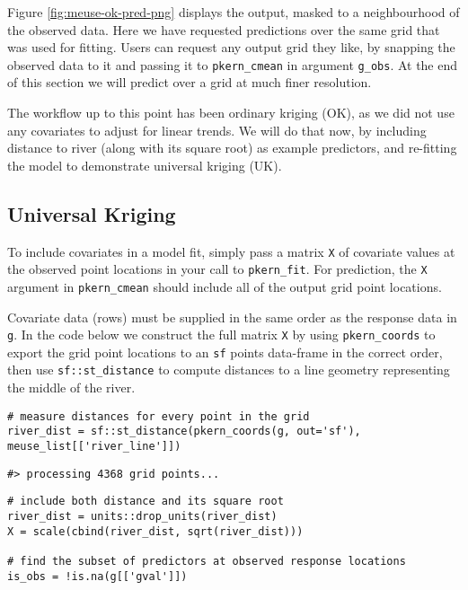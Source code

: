 Figure \ref{fig:meuse-ok-pred-png} displays the output, masked to a neighbourhood of the observed data. Here we have requested predictions over the same grid that was used for fitting. Users can request any output grid they like, by snapping the observed data to it and passing it to \texttt{pkern\_cmean} in argument \texttt{g\_obs}. At the end of this section we will predict over a grid at much finer resolution.

The workflow up to this point has been ordinary kriging (OK), as we did not use any covariates to adjust for linear trends. We will do that now, by including distance to river (along with its square root) as example predictors, and re-fitting the model to demonstrate universal kriging (UK).

\hypertarget{universal-kriging}{%
\subsection{Universal Kriging}\label{universal-kriging}}

To include covariates in a model fit, simply pass a matrix \texttt{X} of covariate values at the observed point locations in your call to \texttt{pkern\_fit}. For prediction, the \texttt{X} argument in \texttt{pkern\_cmean} should include all of the output grid point locations.

Covariate data (rows) must be supplied in the same order as the response data in \texttt{g}. In the code below we construct the full matrix \texttt{X} by using \texttt{pkern\_coords} to export the grid point locations to an \texttt{sf} points data-frame in the correct order, then use \texttt{sf::st\_distance} to compute distances to a line geometry representing the middle of the river.

\begin{verbatim}
# measure distances for every point in the grid
river_dist = sf::st_distance(pkern_coords(g, out='sf'), meuse_list[['river_line']])
\end{verbatim}

\begin{verbatim}
#> processing 4368 grid points...
\end{verbatim}

\begin{verbatim}
# include both distance and its square root
river_dist = units::drop_units(river_dist)
X = scale(cbind(river_dist, sqrt(river_dist)))

# find the subset of predictors at observed response locations
is_obs = !is.na(g[['gval']])
\end{verbatim}

